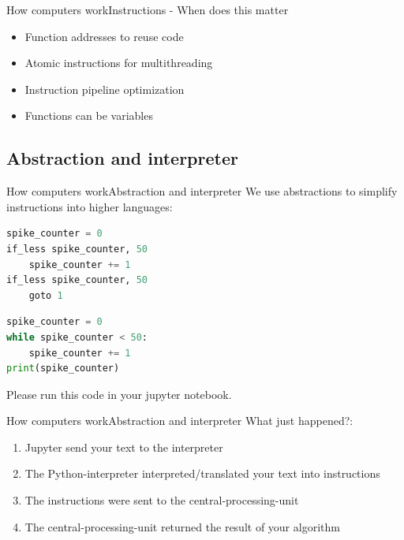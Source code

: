 \documentclass[aspectratio=169]{beamer}
\begin{document}
\begin{frame}{How computers work}{Instructions - When does this matter}
\begin{itemize}
	\item Function addresses to reuse code
	\item Atomic instructions for multithreading
	\item Instruction pipeline optimization
	\item Functions can be variables
\end{itemize}
\end{frame}

\subsection{Abstraction and interpreter}
\begin{frame}[fragile]{How computers work}{Abstraction and interpreter}
We use abstractions to simplify instructions into higher languages:

\begin{lstlisting}[language=Python, frame=single]
spike_counter = 0
if_less spike_counter, 50
	spike_counter += 1
if_less spike_counter, 50
	goto 1
\end{lstlisting}
\pause
\begin{lstlisting}[language=Python, frame=single]
spike_counter = 0
while spike_counter < 50:
	spike_counter += 1
print(spike_counter)
\end{lstlisting}
\pause
Please run this code in your jupyter notebook.
\end{frame}

\begin{frame}{How computers work}{Abstraction and interpreter}
What just happened?:
\begin{enumerate}
	\item Jupyter send your text to the interpreter
	\item The Python-interpreter interpreted/translated your text into instructions
	\item The instructions were sent to the central-processing-unit
	\item The central-processing-unit returned the result of your algorithm
\end{enumerate}
\end{frame}
\end{document}
